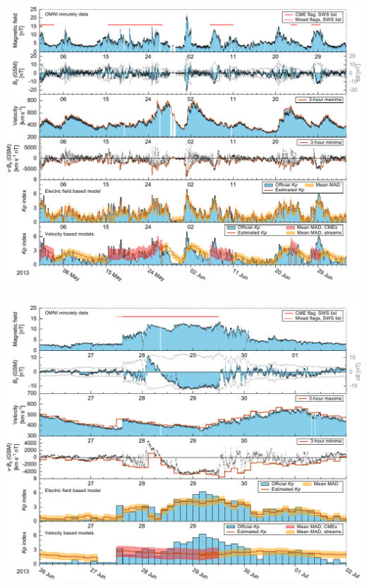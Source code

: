\documentclass[11pt,aspectratio=1610]{beamer}	%
\newcommand{\captionoftiny}[2]{\captionof{#1}{\color{gray} \tiny #2}}
\begin{document}
\begin{frame}[c]{}{}
	\begin{columns}[c]
		
		\includegraphics[width=\textwidth]{../figures_of_mine/chapter2/example_sw_plot_1month_b_9hshift_2013-5-1_65.pdf}


	\end{columns}
\end{frame}
\begin{frame}[c]{}{}
	\begin{columns}[c]
		
		\includegraphics[width=\textwidth]{../figures_of_mine/chapter2/example_sw_plot_CME_b_9hshift_2013-6-26_6.pdf}


	\end{columns}
\end{frame}
\end{document}
